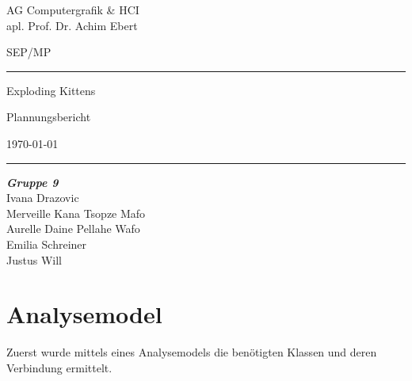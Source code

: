 \documentclass[11pt, a4paper, oneside]{memoir}                                                      %
\begin{document}
    \makeatletter
    \newcommand{\mysubject}{Plannungsbericht}
    \newcommand{\mygroup}{Gruppe 9}
    \newcommand{\myauthor}{
        Ivana Drazovic \\
        Merveille Kana Tsopze Mafo \\
        Aurelle Daine Pellahe Wafo \\
        Emilia Schreiner \\
        Justus Will
    }
    \makeatother

    \thispagestyle{empty}
	\newcommand{\Rule}{\rule{\textwidth}{0.5mm}}
	\begin{center}
        \vspace{0.5em}
        {\Large AG Computergrafik \& HCI \\ apl. Prof. Dr. Achim Ebert \par}
        \vspace{0.5em}
        {\Large SEP/MP \the\year \par}
        \vspace{5cm}

        \Rule
        \vspace{1cm}
        {\Huge Exploding Kittens \par}
        \vspace{0.5em}
        {\Large \mysubject \par}
        \vspace{0.5em}
        {\small \today \par}
        \vspace{0.7cm}
        \Rule

        \vfill %

        \emph{\textbf{\mygroup}} \\[1em]
        \myauthor
	\end{center}

    \newpage
    \tableofcontents
    \newpage

    \section{Analysemodel}
        Zuerst wurde mittels eines Analysemodels die benötigten Klassen und deren Verbindung ermittelt.
\end{document}
